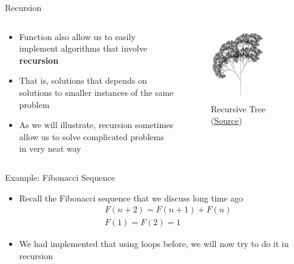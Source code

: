 \documentclass[10pt,xcolor={table,dvipsnames},t]{beamer}
\begin{document}
\begin{frame}[fragile]{Recursion}
  \begin{columns}
    \begin{column}{0.6\textwidth}
      \begin{itemize}
        \item Function also allow us to easily implement algorithms that involve \textbf{recursion}
        \item That is, solutions that depends on solutions to smaller instances of the same problem
        \item As we will illustrate, recursion sometimes allow us to solve complicated problems in very neat way
      \end{itemize}
    \end{column}
    \begin{column}[T]{0.4\textwidth}
      \begin{figure}
        
        \includegraphics[width=0.7\textwidth]{img/RecursiveTree.JPG}
        \caption{Recursive Tree (\href{https://upload.wikimedia.org/wikipedia/commons/f/f7/RecursiveTree.JPG}{Source})}
      \end{figure}
    \end{column}
  \end{columns}
\end{frame}

\begin{frame}{Example: Fibonacci Sequence}
  \begin{itemize}
    \item Recall the Fibonacci sequence that we discuss long time ago
    \begin{align*}
        &F(n+2) = F(n+1) + F(n)\\
        &F(1) = F(2) = 1
    \end{align*}
    \item We had implemented that using loops before, we will now try to do it in recursion 
  \end{itemize}
\end{frame}
\end{document}
